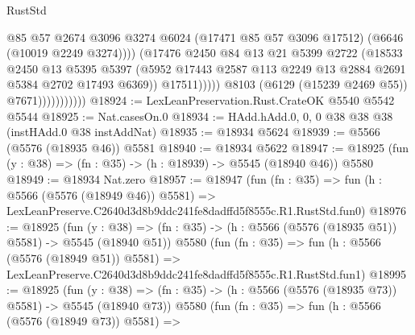 \begin{lexlean}{RustStd}
\begin{coremodule}
                                      @85
                                      @57
                                      @2674
                                      @3096
                                      @3274
                                      @6024
                                      (@17471 @85 @57 @3096 @17512)
                                      (@6646 (@10019 @2249 @3274))))
                                  (@17476
                                    @2450
                                    @84
                                    @13
                                    @21
                                    @5399
                                    @2722
                                    (@18533
                                      @2450
                                      @13
                                      @5395
                                      @5397
                                      (@5952
                                        @17443
                                        @2587
                                        @113
                                        @2249
                                        @13
                                        @2884
                                        @2691
                                        @5384
                                        @2702
                                        @17493
                                        @6369))
                                    @17511)))))
                          @8103
                          (@6129 (@15239 @2469 @55))
                          @7671)))))))))))
@18924 := LexLeanPreservation.Rust.CrateOK @5540 @5542 @5544
@18925 := Nat.casesOn.{0}
@18934 := HAdd.hAdd.{0, 0, 0} @38 @38 @38 (instHAdd.{0} @38 instAddNat)
@18935 := @18934 @5624
@18939 := @5566 (@5576 (@18935 @46)) @5581
@18940 := @18934 @5622
@18947 := @18925 (fun (y : @38) => (fn : @35) -> (h : @18939) -> @5545 (@18940 @46)) @5580
@18949 := @18934 Nat.zero
@18957 := @18947
    (fun (fn : @35) =>
    fun (h : @5566 (@5576 (@18949 @46)) @5581) =>
    LexLeanPreserve.C2640d3d8b9ddc241fe8dadffd5f8555c.R1.RustStd.fun0)
@18976 := @18925
    (fun (y : @38) => (fn : @35) -> (h : @5566 (@5576 (@18935 @51)) @5581) -> @5545 (@18940 @51))
    @5580
    (fun (fn : @35) =>
    fun (h : @5566 (@5576 (@18949 @51)) @5581) =>
    LexLeanPreserve.C2640d3d8b9ddc241fe8dadffd5f8555c.R1.RustStd.fun1)
@18995 := @18925
    (fun (y : @38) => (fn : @35) -> (h : @5566 (@5576 (@18935 @73)) @5581) -> @5545 (@18940 @73))
    @5580
    (fun (fn : @35) =>
    fun (h : @5566 (@5576 (@18949 @73)) @5581) =>

\end{coremodule}
\end{lexlean}
